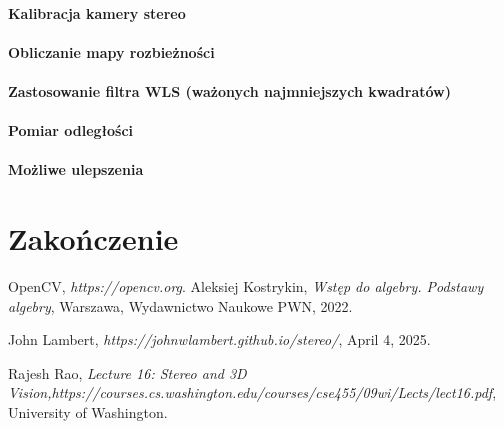 \documentclass[magisterska]{pracadypl}
\begin{document}
\subsubsection{Kalibracja kamery stereo}
\subsubsection{Obliczanie mapy rozbieżności}
\subsubsection{Zastosowanie filtra WLS (ważonych najmniejszych kwadratów)}
\subsubsection{Pomiar odległości}
\subsubsection{Możliwe ulepszenia}

\chapter{Zakończenie}

\begin{thebibliography}{7}
%
OpenCV, 
\textit{https://opencv.org}.
%
Aleksiej Kostrykin, 
\textit{Wstęp do algebry. Podstawy algebry},
Warszawa, Wydawnictwo Naukowe PWN, 2022.

John Lambert, 
\textit{https://johnwlambert.github.io/stereo/}, April 4, 2025.

Rajesh Rao, 
\textit{Lecture 16: Stereo and 3D Vision,https://courses.cs.washington.edu/courses/cse455/09wi/Lects/lect16.pdf}, University of Washington.


\end{thebibliography}
\end{document}
